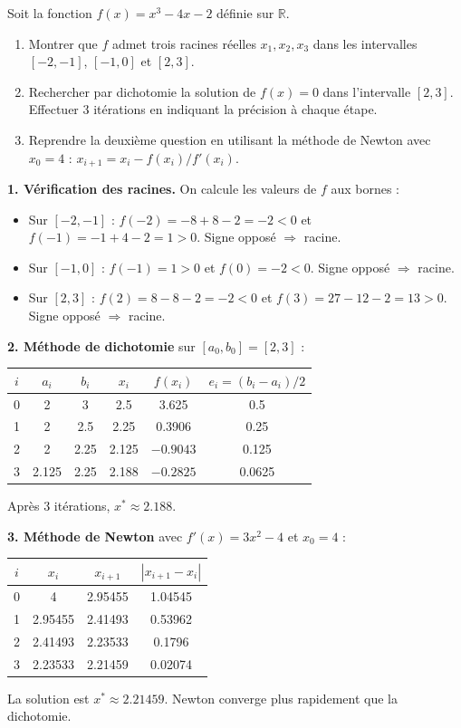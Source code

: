 \documentclass[12pt,a4paper]{article}
\begin{document}
\begin{boiteexercice}
Soit la fonction $f(x) = x^3 - 4x - 2$ définie sur $\mathbb{R}$.
\begin{enumerate}
  \item Montrer que $f$ admet trois racines réelles $x_1, x_2, x_3$ dans les intervalles $[-2,-1]$, $[-1,0]$ et $[2,3]$.
  \item Rechercher par dichotomie la solution de $f(x) = 0$ dans l'intervalle $[2, 3]$. Effectuer 3 itérations en indiquant la précision à chaque étape.
  \item Reprendre la deuxième question en utilisant la méthode de Newton avec $x_0 = 4$ : $x_{i+1} = x_i - f(x_i)/f'(x_i)$.
\end{enumerate}
\end{boiteexercice}

\begin{boitecorrige}
\textbf{1. Vérification des racines.} On calcule les valeurs de $f$ aux bornes :
\begin{itemize}
  \item Sur $[-2,-1]$ : $f(-2) = -8+8-2 = -2 < 0$ et $f(-1) = -1+4-2 = 1 > 0$. Signe opposé $\Rightarrow$ racine.
  \item Sur $[-1,0]$ : $f(-1) = 1 > 0$ et $f(0) = -2 < 0$. Signe opposé $\Rightarrow$ racine.
  \item Sur $[2,3]$ : $f(2) = 8-8-2 = -2 < 0$ et $f(3) = 27-12-2 = 13 > 0$. Signe opposé $\Rightarrow$ racine.
\end{itemize}

\textbf{2. Méthode de dichotomie} sur $[a_0, b_0] = [2, 3]$ :

\begin{center}
\begin{tabular}{|c|c|c|c|c|c|}
\hline
$i$ & $a_i$ & $b_i$ & $x_i$ & $f(x_i)$ & $e_i = (b_i-a_i)/2$ \\
\hline
0 & 2 & 3 & 2.5 & 3.625 & 0.5 \\
1 & 2 & 2.5 & 2.25 & 0.3906 & 0.25 \\
2 & 2 & 2.25 & 2.125 & $-0.9043$ & 0.125 \\
3 & 2.125 & 2.25 & 2.188 & $-0.2825$ & 0.0625 \\
\hline
\end{tabular}
\end{center}
Après 3 itérations, $x^* \approx 2.188$.

\textbf{3. Méthode de Newton} avec $f'(x) = 3x^2-4$ et $x_0 = 4$ :

\begin{center}
\begin{tabular}{|c|c|c|c|}
\hline
$i$ & $x_i$ & $x_{i+1}$ & $|x_{i+1}-x_i|$ \\
\hline
0 & 4 & 2.95455 & 1.04545 \\
1 & 2.95455 & 2.41493 & 0.53962 \\
2 & 2.41493 & 2.23533 & 0.1796 \\
3 & 2.23533 & 2.21459 & 0.02074 \\
\hline
\end{tabular}
\end{center}
La solution est $x^* \approx 2.21459$. Newton converge plus rapidement que la dichotomie.
\end{boitecorrige}
\end{document}
